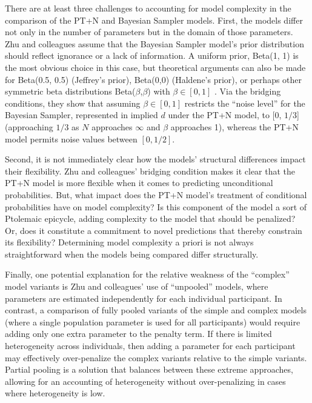 \documentclass[
  english,
  man,floatsintext]{apa6}
\begin{document}
There are at least three challenges to accounting for model complexity in the comparison of the PT+N and Bayesian Sampler models. First, the models differ not only in the number of parameters but in the domain of those parameters. Zhu and colleagues \autocite*{zhu.etal2020} assume that the Bayesian Sampler model's prior distribution should reflect ignorance or a lack of information. A uniform prior, Beta(1, 1) is the most obvious choice in this case, but theoretical arguments can also be made for Beta(0.5, 0.5) (Jeffrey's prior), Beta(0,0) (Haldene's prior), or perhaps other symmetric beta distributions Beta(\(\beta\),\(\beta\)) with \(\beta \in [0, 1]\) \autocite{jaynes2003}. Via the bridging conditions, they show that assuming \(\beta \in [0, 1]\) restricts the ``noise level'' for the Bayesian Sampler, represented in implied \(d\) under the PT+N model, to {[}0, \(1/3\){]} (approaching \(1/3\) as \(N\) approaches \(\infty\) and \(\beta\) approaches 1), whereas the PT+N model permits noise values between \([0, 1/2]\).

Second, it is not immediately clear how the models' structural differences impact their flexibility. Zhu and colleagues' \autocite*{zhu.etal2020} bridging condition makes it clear that the PT+N model is more flexible when it comes to predicting unconditional probabilities. But, what impact does the PT+N model's treatment of conditional probabilities have on model complexity? Is this component of the model a sort of Ptolemaic epicycle, adding complexity to the model that should be penalized? Or, does it constitute a commitment to novel predictions that thereby constrain its flexibility? Determining model complexity a priori is not always straightforward when the models being compared differ structurally.

Finally, one potential explanation for the relative weakness of the ``complex'' model variants is Zhu and colleagues' \autocite*{zhu.etal2020} use of ``unpooled'' models, where parameters are estimated independently for each individual participant. In contrast, a comparison of fully pooled variants of the simple and complex models (where a single population parameter is used for all participants) would require adding only one extra parameter to the penalty term. If there is limited heterogeneity across individuals, then adding a parameter for each participant may effectively over-penalize the complex variants relative to the simple variants. Partial pooling is a solution that balances between these extreme approaches, allowing for an accounting of heterogeneity without over-penalizing in cases where heterogeneity is low.
\end{document}
